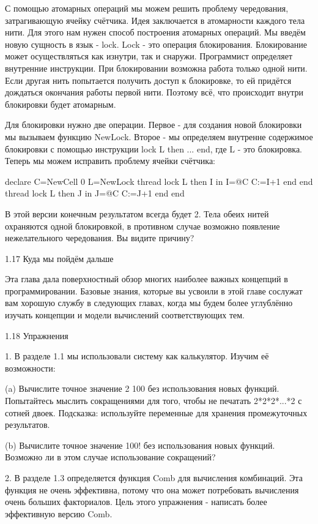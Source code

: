 С помощью атомарных операций мы можем решить проблему чередования, затрагивающую ячейку счётчика. Идея заключается в атомарности каждого тела нити. Для этого нам нужен способ построения атомарных операций. Мы введём новую сущность в язык - lock. Lock - это операция блокирования. Блокирование может осуществляться как изнутри, так и снаружи. Программист определяет внутренние инструкции. При блокировании возможна работа только одной нити. Если другая нить попытается получить доступ к блокировке, то ей придётся дождаться окончания работы первой нити. Поэтому всё, что происходит внутри блокировки будет атомарным.

Для блокировки нужно две операции. Первое - для создания новой блокировки мы вызываем функцию NewLock. Второе - мы определяем внутренне содержимое блокировки с помощью инструкции lock L then ... end, где L - это блокировка. Теперь мы можем исправить проблему ячейки счётчика:

declare
C={NewCell 0}
L={NewLock}
thread
lock L then I in
I=@C
C:=I+1
end
end
thread
lock L then J in
J=@C
C:=J+1
end
end

В этой версии конечным результатом всегда будет 2. Тела обеих нитей охраняются одной блокировкой, в противном случае возможно появление нежелательного чередования. Вы видите причину?

1.17 Куда мы пойдём дальше

Эта глава дала поверхностный обзор многих наиболее важных концепций в программировании. Базовые знания, которые вы усвоили в этой главе сослужат вам хорошую службу в следующих главах, когда мы будем более углублённо изучать концепции и модели вычислений соответствующих тем.

1.18 Упражнения

1. В разделе 1.1 мы использовали систему как калькулятор. Изучим её возможности:

(a) Вычислите точное значение 2 100 без использования новых функций. Попытайтесь мыслить сокращениями для того, чтобы не печатать 2*2*2*...*2 с сотней двоек. Подсказка: используйте переменные для хранения промежуточных результатов.

(b) Вычислите точное значение 100! без использования новых функций. Возможно ли в этом случае использование сокращений?

2. В разделе 1.3 определяется функция Comb для вычисления комбинаций. Эта функция не очень эффективна, потому что она может потребовать вычисления очень больших факториалов. Цель этого упражнения - написать более эффективную версию Comb.

